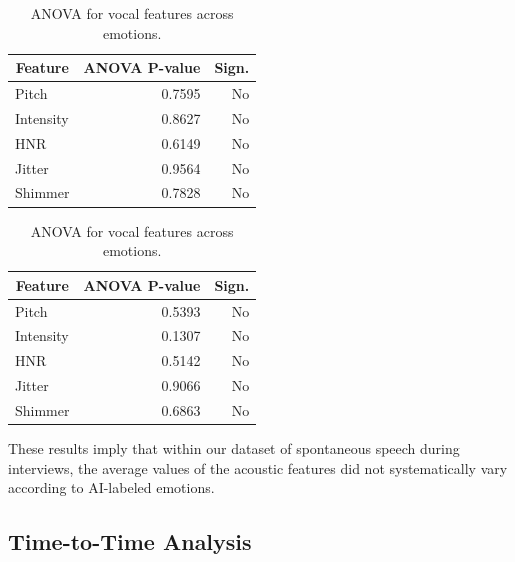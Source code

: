 \begin{table}[H]
    \centering 
    \begin{subtable}[b]{0.48\textwidth}
        \centering
        \caption*{\textbf{Positive recordings}}
        \begin{tabular}{lrr}
        \toprule
        \multicolumn{1}{c}{\textbf{Feature}} & \textbf{ANOVA P-value} & \textbf{Sign.} \\
        \midrule
        Pitch      & 0.7595    & No          \\
        Intensity  & 0.8627    & No          \\
        HNR        & 0.6149    & No          \\
        Jitter     & 0.9564    & No          \\
        Shimmer    & 0.7828    & No          \\
        \bottomrule
        \end{tabular}
        \caption{ANOVA: Positive recordings.}
        \label{tab:rq1_anova_pos}
    \end{subtable}
    \hfill
    \begin{subtable}[b]{0.48\textwidth}
        \centering
        \caption*{\textbf{Negative recordings}}
        \begin{tabular}{lrr}
        \toprule
        \multicolumn{1}{c}{\textbf{Feature}} & \textbf{ANOVA P-value} & \textbf{Sign.} \\
        \midrule
        Pitch      & 0.5393    & No          \\
        Intensity  & 0.1307    & No          \\
        HNR        & 0.5142    & No          \\
        Jitter     & 0.9066    & No          \\
        Shimmer    & 0.6863    & No          \\
        \bottomrule
        \end{tabular}
        \caption{ANOVA: Negative recordings.}
        \label{tab:rq1_anova_neg}
    \end{subtable}
    \caption{ANOVA for vocal features across emotions.}
    \label{tab:rq1_anova_all}
\end{table}  
  
These results imply that within our dataset of spontaneous speech during interviews, the average values of the acoustic features did not systematically vary according to AI-labeled emotions. 


\subsection{Time-to-Time Analysis}



